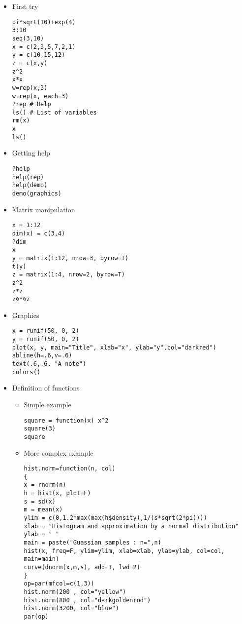 \documentclass[a4paper,10pt]{article}
\begin{document}
\begin{itemize}
 \item First try
\begin{lstlisting}
pi*sqrt(10)+exp(4)
3:10
seq(3,10)
x = c(2,3,5,7,2,1)
y = c(10,15,12)
z = c(x,y)
z^2
x*x
w=rep(x,3)
w=rep(x, each=3)
?rep # Help
ls() # List of variables
rm(x)
x
ls()
\end{lstlisting}

\item Getting help 
\begin{lstlisting}
?help
help(rep)
help(demo)
demo(graphics)
\end{lstlisting}


\item Matrix manipulation 
\begin{lstlisting}
x = 1:12
dim(x) = c(3,4)
?dim
x
y = matrix(1:12, nrow=3, byrow=T)
t(y)
z = matrix(1:4, nrow=2, byrow=T)
z^2
z*z
z%*%z
\end{lstlisting}

\item Graphics 
\begin{lstlisting}
x = runif(50, 0, 2)
y = runif(50, 0, 2)
plot(x, y, main="Title", xlab="x", ylab="y",col="darkred")
abline(h=.6,v=.6)
text(.6,.6, "A note")
colors()
\end{lstlisting} 

\item Definition of functions 
\begin{itemize} 
\item Simple example 
\begin{lstlisting}
square = function(x) x^2
square(3)
square
\end{lstlisting} 

\item More complex example 
\begin{lstlisting}
hist.norm=function(n, col)
{
x = rnorm(n)
h = hist(x, plot=F)
s = sd(x)
m = mean(x)
ylim = c(0,1.2*max(max(h$density),1/(s*sqrt(2*pi))))
xlab = "Histogram and approximation by a normal distribution"
ylab = " "
main = paste("Guassian samples : n=",n)
hist(x, freq=F, ylim=ylim, xlab=xlab, ylab=ylab, col=col, main=main)
curve(dnorm(x,m,s), add=T, lwd=2)
}
op=par(mfcol=c(1,3))
hist.norm(200 , col="yellow")
hist.norm(800 , col="darkgoldenrod")
hist.norm(3200, col="blue")
par(op)
\end{lstlisting} 

\end{itemize}
\end{itemize}
\end{document}
